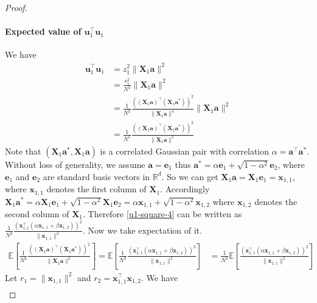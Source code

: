 \documentclass{article}
\theoremstyle{plain}
\theoremstyle{definition}
\theoremstyle{remark}
\begin{document}
\begin{proof}
    \paragraph{Expected value of $\mathbf{u}_1^\top \mathbf{u}_1$} We have
    \begin{align}
        \mathbf{u}_1^\top \mathbf{u}_1 & = z_1^2 \| \mathbf{X}_1 \mathbf{a} \|^2 \\
        & = \frac{s_1^2}{N^2} \| \mathbf{X}_1 \mathbf{a} \|^2 \\
        & = \frac{1}{N^2} \frac{((\mathbf{X}_1 \mathbf{a})^\top(\mathbf{X}_1 \mathbf{a}^*))^2}{\|  \mathbf{X}_1 \mathbf{a} \|^4} \| \mathbf{X}_1 \mathbf{a} \|^2 \\
         & = \frac{1}{N^2} \frac{((\mathbf{X}_1 \mathbf{a})^\top(\mathbf{X}_1 \mathbf{a}^*))^2}{\|  \mathbf{X}_1 \mathbf{a} \|^2} \label{u1-square-4}
    \end{align}
    Note that $(\mathbf{X}_1 \mathbf{a}^*, \mathbf{X}_1 \mathbf{a})$ is a correlated Gaussian pair with correlation $\alpha = \mathbf{a}^\top\mathbf{a}^*$. Without loss of generality, we assume $\mathbf{a}=\mathbf{e}_1$ thus $\mathbf{a}^*=\alpha \mathbf{e}_1+\sqrt{1-\alpha^2}\mathbf{e}_2$, where $\mathbf{e}_1$ and $\mathbf{e}_2$ are standard basis vectors in $\mathbb{R}^d$. So we can get $\mathbf{X}_1\mathbf{a}=\mathbf{X}_1 \mathbf{e}_1=\mathbf{x}_{1,1}$, where $\mathbf{x}_{1,1}$ denotes the first column of $\mathbf{X}_1$. Accordingly $\mathbf{X}_1\mathbf{a}^* = \alpha \mathbf{X}_1 \mathbf{e}_1+\sqrt{1-\alpha^2}\mathbf{X}_1 \mathbf{e}_2= \alpha \mathbf{x}_{1,1} + \sqrt{1-\alpha^2} \mathbf{x}_{1,2}$ where $\mathbf{x}_{1,2}$ denotes the second column of $\mathbf{X}_{1}$. Therefore \eqref{u1-square-4} can be written as $\frac{1}{N^2}\frac{(\mathbf{x}_{1,1}^\top(\alpha \mathbf{x}_{1,1} + \beta \mathbf{x}_{1,2}))^2}{\| \mathbf{x}_{1,1} \|^2}$. Now we take expectation of it.
    \begin{align}
        \mathbb{E}\left[\frac{1}{N^2} \frac{((\mathbf{X}_1 \mathbf{a})^\top(\mathbf{X}_1 \mathbf{a}^*))^2}{\|  \mathbf{X}_1 \mathbf{a} \|^2} \right] = \mathbb{E}\left[\frac{1}{N^2}\frac{(\mathbf{x}_{1,1}^\top(\alpha \mathbf{x}_{1,1} + \beta \mathbf{x}_{1,2}))^2}{\| \mathbf{x}_{1,1} \|^2}\right] & = \frac{1}{N^2} \mathbb{E}\left[ \frac{(\mathbf{x}_{1,1}^\top(\alpha \mathbf{x}_{1,1} + \beta \mathbf{x}_{1,2}))^2}{\| \mathbf{x}_{1,1} \|^2} \right] 
    \end{align}
    Let $r_1=\| \mathbf{x}_{1,1}\|^2$ and $r_2 = \mathbf{x}_{1,1}^\top \mathbf{x}_{1,2}$. We have
    \begin{align}

\end{align}
\end{proof}
\end{document}
